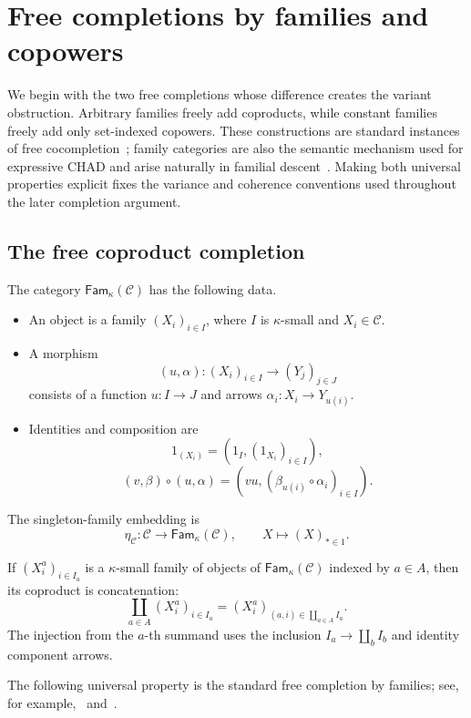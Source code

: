 \documentclass[runningheads,envcountsame]{llncs}
\newcommand{\Fam}{\mathsf{Fam}}
\begin{document}
\section{Free completions by families and copowers}
\label{app:free-completions}

We begin with the two free completions whose difference creates the variant obstruction. Arbitrary families freely add coproducts, while constant families freely add only set-indexed copowers. These constructions are standard instances of free cocompletion~\cite{Kelly1982,AdamekRosicky2020}; family categories are also the semantic mechanism used for expressive CHAD and arise naturally in familial descent~\cite{LucatelliNunesVakar2023,Prezado2024}. Making both universal properties explicit fixes the variance and coherence conventions used throughout the later completion argument.

\subsection{The free coproduct completion}

\begin{definition}
\label{def:fam-app}
The category $\Fam_\kappa(\mathcal C)$ has the following data.
\begin{itemize}
\item An object is a family $(X_i)_{i\in I}$, where $I$ is $\kappa$-small and $X_i\in\mathcal C$.
\item A morphism
$$
(u,\alpha):(X_i)_{i\in I}\longrightarrow(Y_j)_{j\in J}
$$
consists of a function $u:I\to J$ and arrows $\alpha_i:X_i\to Y_{u(i)}$.
\item Identities and composition are
$$
1_{(X_i)}=(1_I,(1_{X_i})_{i\in I}),
$$
$$
(v,\beta)\circ(u,\alpha)
=
(vu,(\beta_{u(i)}\circ\alpha_i)_{i\in I}).
$$
\end{itemize}
The singleton-family embedding is
$$
\eta_\mathcal C:\mathcal C\longrightarrow\Fam_\kappa(\mathcal C),
\qquad
X\longmapsto(X)_{*\in1}.
$$
\end{definition}

If $(X_i^a)_{i\in I_a}$ is a $\kappa$-small family of objects of $\Fam_\kappa(\mathcal C)$ indexed by $a\in A$, then its coproduct is concatenation:
$$
\coprod_{a\in A}(X_i^a)_{i\in I_a}
=
(X_i^a)_{(a,i)\in\coprod_{a\in A}I_a}.
$$
The injection from the $a$-th summand uses the inclusion $I_a\to\coprod_b I_b$ and identity component arrows.

The following universal property is the standard free completion by families; see, for example,~\cite[Section~5.3]{Kelly1982} and~\cite[Section~2]{AdamekRosicky2020}.
\end{document}
